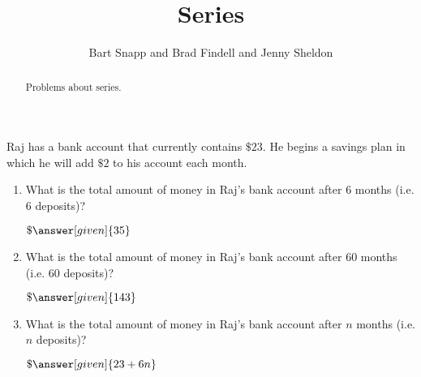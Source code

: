 \documentclass[nooutcomes]{ximera}
\title{Series}
\author{Bart Snapp and Brad Findell and Jenny Sheldon}
\begin{document}
\begin{abstract}
Problems about series.
\end{abstract}
\maketitle




\begin{problem}
Raj has a bank account that currently contains $\$23$.  He begins a savings plan in which he will add $\$2$ to his account each month.  

\begin{enumerate}
\item What is the total amount of money in Raj's bank account after $6$ months (i.e. $6$ deposits)? \begin{prompt} $\$\answer[given]{35}$\end{prompt}
\item What is the total amount of money in Raj's bank account after $60$ months (i.e. $60$ deposits)? \begin{prompt} $\$\answer[given]{143}$\end{prompt}
\item What is the total amount of money in Raj's bank account after $n$ months (i.e. $n$ deposits)? \begin{prompt} $\$\answer[given]{23+6n}$ \end{prompt}
\end{enumerate}
\end{problem}
\end{document}
